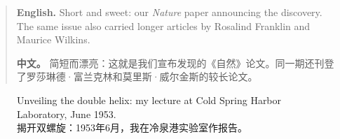 \begin{quote}
\noindent\textbf{English.} Short and sweet: our \emph{Nature} paper announcing the discovery. The same issue also carried longer articles by Rosalind Franklin and Maurice Wilkins.

\smallskip
\noindent\textbf{中文。} 简短而漂亮：这就是我们宣布发现的《自然》论文。同一期还刊登了罗莎琳德·富兰克林和莫里斯·威尔金斯的较长论文。
\end{quote}

\begin{figure}[htbp]
\centering
{}
\caption{Unveiling the double helix: my lecture at Cold Spring Harbor Laboratory, June 1953.\\揭开双螺旋：1953年6月，我在冷泉港实验室作报告。}
\end{figure}

